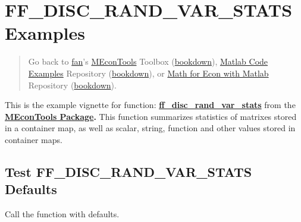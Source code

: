 \documentclass[
]{book}
\begin{document}
\hypertarget{ff_disc_rand_var_stats-examples}{%
\section{FF\_DISC\_RAND\_VAR\_STATS Examples}\label{ff_disc_rand_var_stats-examples}}

\begin{quote}
Go back to \href{http://fanwangecon.github.io/}{fan}'s \href{https://fanwangecon.github.io/MEconTools/}{MEconTools} Toolbox (\href{https://fanwangecon.github.io/MEconTools/bookdown}{bookdown}), \href{https://fanwangecon.github.io/M4Econ/}{Matlab Code Examples} Repository (\href{https://fanwangecon.github.io/M4Econ/bookdown}{bookdown}), or \href{https://fanwangecon.github.io/Math4Econ/}{Math for Econ with Matlab} Repository (\href{https://fanwangecon.github.io/Math4Econ/bookdown}{bookdown}).
\end{quote}

This is the example vignette for function:
\href{https://github.com/FanWangEcon/MEconTools/blob/master/MEconTools/stats/ff_disc_rand_var_stats.m}{\textbf{ff\_disc\_rand\_var\_stats}}
from the \href{https://fanwangecon.github.io/MEconTools/}{\textbf{MEconTools
Package}}\textbf{.} This function
summarizes statistics of matrixes stored in a container map, as well as
scalar, string, function and other values stored in container maps.

\hypertarget{test-ff_disc_rand_var_stats-defaults}{%
\subsection{Test FF\_DISC\_RAND\_VAR\_STATS Defaults}\label{test-ff_disc_rand_var_stats-defaults}}

Call the function with defaults.
\end{document}
